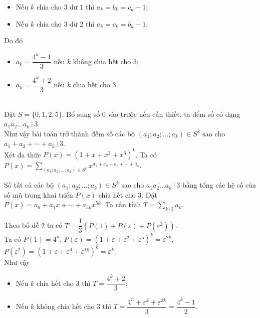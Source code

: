 \begin{bt}[VMO 2015]
{\begin{itemize}
			\item Nếu $ k $ chia cho $ 3 $ dư $ 1 $ thì $ a_k=b_k=c_k-1 $;
			\item Nếu $ k $ chia cho $ 3 $ dư $ 2 $ thì $ a_k=c_k=b_k-1 $.
		\end{itemize}
		Do đó
		\begin{itemize}
			\item $ a_k=\dfrac{4^k-1}{3} $ nếu $ k $ không chia hết cho $ 3 $;
			\item $ a_k=\dfrac{4^k+2}{3} $ nếu $ k $ chia hết cho $ 3 $.
		\end{itemize}
		\\
		Đặt $ S=\{0,1,2,5\} $. Bổ sung số $ 0 $ vào trước nếu cần thiết, ta đếm số có dạng $ \overline{a_1a_2\ldots a_k}\ \vdots \ 3 $.\\
		Như vậy bài toán trở thành đếm số các bộ $ (a_1;a_2;\ldots;a_k) \in S^k $ sao cho $ a_1+a_2+\cdots+a_k\ \vdots \ 3$.\\
		Xét đa thức $ P(x)=(1+x+x^2+x^5)^k $. Ta có $ P(x)=\displaystyle\sum\limits_{(a_1;a_2;\ldots;a_k) \in S^k} x^{a_1+a_2+a_3+\cdots+a_k} $.
		\begin{nx}
			Số tất cả các bộ $ (a_1;a_2;\ldots;a_k) \in S^k $ sao cho $ \overline{a_1a_2\ldots a_k}\ \vdots \ 3 $ bằng tổng các hệ số của số mũ trong khai triển $ P(x) $ chia hết cho $ 3 $. Đặt $ P(x)=a_0+a_1x+\cdots+a_{5k}x^{5k} $. Ta cần tính $ T=\displaystyle\sum\limits_{k\ \vdots \ 3}a_k $.
		\end{nx}
		Theo bổ đề $ 2 $ ta có $ T=\dfrac{1}{3}\left(P(1)+P(\varepsilon)+P(\varepsilon^2)\right) $.\\
		Ta có $ P(1)=4^n $, $ P(\varepsilon)=(1+\varepsilon+\varepsilon^2+\varepsilon^5)^k=\varepsilon ^{2k} $, $ P(\varepsilon ^2)=(1+\varepsilon+\varepsilon ^4+\varepsilon^10)^k=\varepsilon^k $.\\
		Như vậy 
		\begin{itemize}
			\item Nếu $ k $ chia hết cho $ 3 $ thì $ T=\dfrac{4^k+2}{3} $;
			\item Nếu $ k $ không chia hết cho $ 3 $ thì $ T=\dfrac{4^n+\varepsilon^k+\varepsilon^{2k}}{3}=\dfrac{4^k-1}{2} $.
		\end{itemize}
	}
\end{bt}

